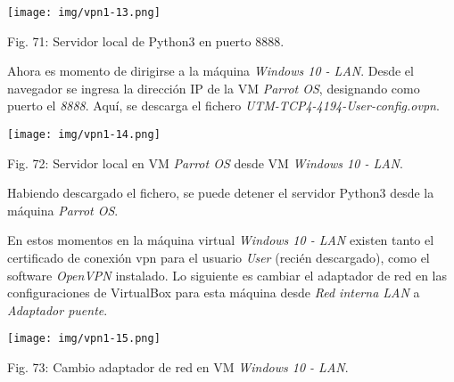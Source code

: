 \documentclass[12pt,oneside,a4paper]{book}
\begin{document}
\vspace{2em}

\begin{center}
    \texttt{[image: img/vpn1-13.png]}
    
\vspace{0.1em}
    
    Fig. 71: Servidor local de Python3 en puerto 8888.
\end{center}

\vspace{2em}

\hspace{20pt}
Ahora es momento de dirigirse a la máquina \textit{Windows 10 - LAN}. Desde el navegador se ingresa la dirección IP de la VM \textit{Parrot OS}, designando como puerto el \textit{8888}. Aquí, se descarga el fichero \textit{UTM-TCP4-4194-User-config.ovpn}.

\vspace{2em}

\begin{center}
    \texttt{[image: img/vpn1-14.png]}
    
\vspace{0.1em}
    
    Fig. 72: Servidor local en VM \textit{Parrot OS} desde VM \textit{Windows 10 - LAN}.
\end{center}

\vspace{2em}

\hspace{20pt}
Habiendo descargado el fichero, se puede detener el servidor Python3 desde la máquina \textit{Parrot OS}.

\vspace{1em}

\hspace{20pt}
En estos momentos en la máquina virtual \textit{Windows 10 - LAN} existen tanto el certificado de conexión vpn para el usuario \textit{User} (recién descargado), como el software \textit{OpenVPN} instalado. Lo siguiente es cambiar el adaptador de red en las configuraciones de VirtualBox para esta máquina desde \textit{Red interna LAN} a \textit{Adaptador puente}.

\vspace{2em}

\begin{center}
    \texttt{[image: img/vpn1-15.png]}
    
\vspace{0.1em}
    
    Fig. 73: Cambio adaptador de red en VM \textit{Windows 10 - LAN}.
\end{center}
\end{document}

